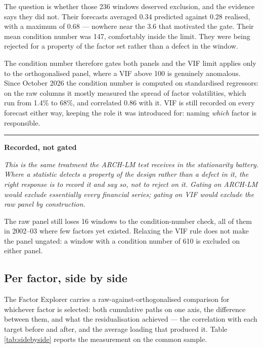 \documentclass[11pt,a4paper]{article}
\newenvironment{decision}[1]
  {\par\vspace{1.7ex}%
   \begin{lrbox}{\decisionbox}\begin{minipage}{\textwidth}%
   {\color{rule}\rule{\textwidth}{0.4pt}}\par\vspace{0.7ex}
   {\small\sffamily\bfseries\color{navy}#1}\par\vspace{0.35ex}
   \small\itshape}
  {\par\vspace{0.7ex}\noindent{\color{rule}\rule{\textwidth}{0.4pt}}%
   \end{minipage}\end{lrbox}%
   \noindent\usebox{\decisionbox}\par\vspace{1.7ex}}
\begin{document}
The question is whether those 236 windows deserved exclusion, and the evidence says
they did not. Their forecasts averaged 0.34 predicted against 0.28 realised, with a
maximum of 0.68 --- nowhere near the 3.6 that motivated the gate. Their mean condition
number was 147, comfortably inside the limit. They were being rejected for a property
of the factor set rather than a defect in the window.

The condition number therefore gates both panels and the VIF limit applies only to
the orthogonalised panel, where a VIF above 100 is genuinely anomalous. Since
October 2026 the condition number is computed on standardised regressors: on the raw
columns it mostly measured the spread of factor volatilities, which run from 1.4\% to
68\%, and correlated 0.86 with it. VIF is
still recorded on every forecast either way, keeping the role it was introduced for:
naming \emph{which} factor is responsible.

\begin{decision}{Recorded, not gated}
This is the same treatment the ARCH-LM test receives in the stationarity battery.
Where a statistic detects a property of the design rather than a defect in it, the
right response is to record it and say so, not to reject on it. Gating on ARCH-LM
would exclude essentially every financial series; gating on VIF would exclude the raw
panel by construction.
\end{decision}

The raw panel still loses 16 windows to the condition-number check, all of them in
2002--03 where few factors yet existed. Relaxing the VIF rule does not make the panel
ungated: a window with a condition number of 610 is excluded on either panel.

\subsection{Per factor, side by side}
\label{sec:perfactor}

The Factor Explorer carries a raw-against-orthogonalised comparison for whichever
factor is selected: both cumulative paths on one axis, the difference between them,
and what the residualisation achieved --- the correlation with each target before and
after, and the average loading that produced it. Table \ref{tab:sidebyside} reports
the measurement on the common sample.
\end{document}
